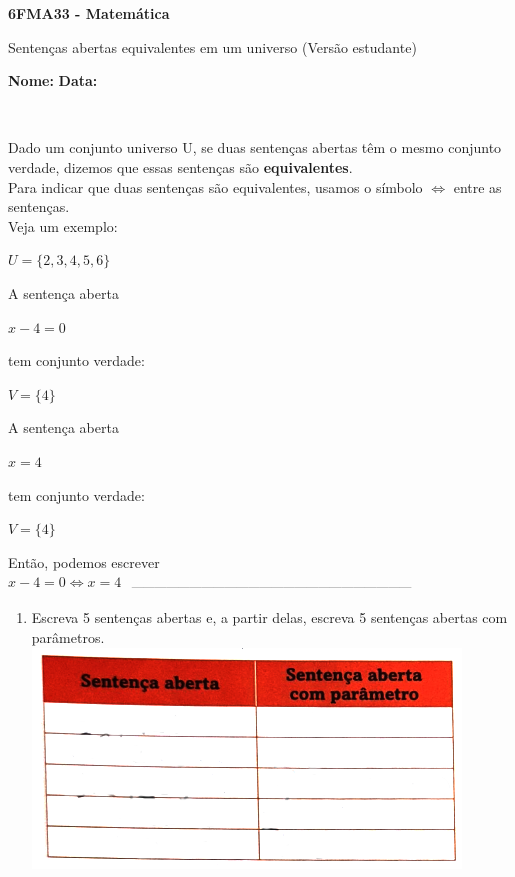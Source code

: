 \documentclass[a4paper,14pt]{article}
\begin{document}
	
	\noindent\textbf{6FMA33 - Matemática} 
	
	\begin{center}Sentenças abertas equivalentes em um universo (Versão estudante)
	\end{center}
	
	\noindent\textbf{Nome:} \underline{\hspace{10cm}}
	\noindent\textbf{Data:} \underline{\hspace{4cm}}
	
	~ \\
    \begin{multicols}{2}
    	\noindent Dado um conjunto universo U, se duas sentenças abertas têm o mesmo conjunto verdade, dizemos que essas sentenças são \textbf{equivalentes}. \\
    	Para indicar que duas sentenças são equivalentes, usamos o símbolo $ \Leftrightarrow$ entre as sentenças. \\
    	Veja um exemplo:
    	\begin{center}
    		$U = \{2, 3, 4, 5, 6\}$
    	\end{center}
    	A sentença aberta
    	\begin{center}
    		$x - 4 = 0$
    	\end{center}
    	tem conjunto verdade:
    	\begin{center}
    		$V = \{4\}$
    	\end{center}
    	A sentença aberta
    	\begin{center}
    		$x = 4$
    	\end{center}
    	tem conjunto verdade:
    	\begin{center}
    		$V = \{4\}$
    	\end{center}
    	Então, podemos escrever \\
    	 $x - 4 = 0 \Leftrightarrow x = 4$
    	\noindent\textsubscript{~------------------------------------------------------------------------}
    	\begin{enumerate}
    		\item Escreva 5 sentenças abertas e, a partir delas, escreva 5 sentenças abertas com parâmetros.
    		\includegraphics[width=1\linewidth]{imagens_6FMA33/tabela1}

\end{enumerate}
\end{multicols}
\end{document}
